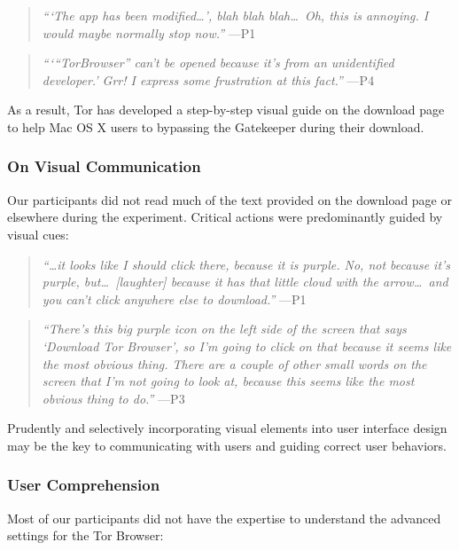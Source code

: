 \documentclass[letterpaper,twocolumn,11pt]{article}
\begin{document}
\begin{quote}{\it
``\/`The app has been modified\ldots', blah blah blah\ldots\  Oh, this is annoying. I would maybe normally stop now.''} \mbox{---P1}
\end{quote}

\begin{quote}{\it
``\/`\/``TorBrowser'' can't be opened because it's from an unidentified developer.'
Grr! I express some frustration at this fact.''} \mbox{---P4}
\end{quote}

As a result, Tor has developed a step-by-step visual guide on the download page to 
help Mac OS X users to bypassing the Gatekeeper during their download. 

\subsubsection{On Visual Communication}
Our participants did not read much of the text provided on the download page or elsewhere during 
the experiment. Critical actions were predominantly guided by visual cues:

\begin{quote}{\it
``\ldots it looks like I should click there, because it is purple. No, not because it's purple, but\ldots\ 
[laughter] because it has that little cloud with the arrow\ldots\ and you can't click anywhere else to download.''} \mbox{---P1} 
\end{quote}

\begin{quote}{\it
``There's this big purple icon on the left side of the screen that says `Download Tor Browser',
so I'm going to click on that because it seems like the most obvious thing.
There are a couple of other small words on the screen that I'm not going to look at, because this seems like the most obvious thing to do.''} \mbox{---P3}
\end{quote}

Prudently and selectively incorporating visual elements into user interface design may be the key to 
communicating with users and guiding correct user behaviors.

\subsubsection{User Comprehension} 

Most of our participants did not have the expertise to understand 
the advanced settings for the Tor Browser: 
\end{document}

